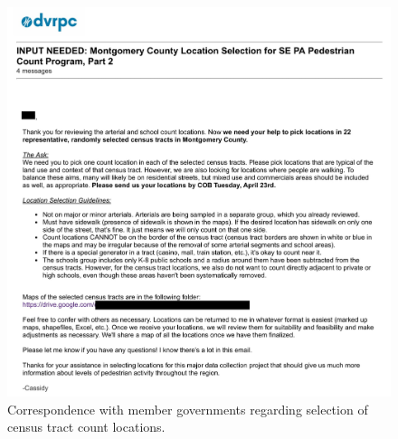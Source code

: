 \documentclass[paper=letterpaper, fontsize=11pt]{scrartcl}
\begin{document}
\FloatBarrier
\begin{figure}[!htbp]
	\centering
	\includegraphics[width=\textwidth]{county-corresp-3.jpg}
	\caption{Correspondence with member governments regarding selection of census tract count locations.}
	\label{corresp-3}
\end{figure}
\FloatBarrier
\end{document}

